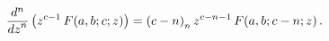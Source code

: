 \[\frac{{d}^{n}}{{dz}^{n}}\left(z^{c-1}\mathop{F\/}\nolimits\!\left(a,b;c;z%
\right)\right)=\left(c-n\right)_{n}z^{c-n-1}\mathop{F\/}\nolimits\!\left(a,b;c%
-n;z\right).\]